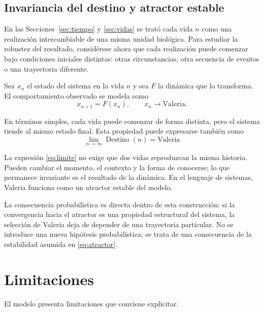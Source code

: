 \documentclass[conference]{IEEEtran}
\begin{document}
\subsection{Invariancia del destino y atractor estable}

En las Secciones~\ref{sec:tiempo} y \ref{sec:vidas} se trató cada vida $n$ como
una realización intercambiable de una misma unidad biológica. Para estudiar la
robustez del resultado, considérese ahora que cada realización puede comenzar
bajo condiciones iniciales distintas: otras circunstancias, otra secuencia de
eventos o una trayectoria diferente.

Sea $x_n$ el estado del sistema en la vida $n$ y sea $F$ la dinámica que lo
transforma. El comportamiento observado se modela como
\begin{equation}
x_{n+1}=F(x_n), \qquad x_n \longrightarrow \mathrm{Valeria}.
\label{eq:atractor}
\end{equation}

En términos simples, cada vida puede comenzar de forma distinta, pero el
sistema tiende al mismo estado final. Esta propiedad puede expresarse también
como
\begin{equation}
\boxed{\;\lim_{n\rightarrow\infty}
\operatorname{Destino}(n)=\mathrm{Valeria}\;}
\label{eq:limite}
\end{equation}

La expresión \eqref{eq:limite} no exige que dos vidas reproduzcan la misma
historia. Pueden cambiar el momento, el contexto y la forma de conocerse; lo
que permanece invariante es el resultado de la dinámica. En el lenguaje de
sistemas, Valeria funciona como un atractor estable del modelo.

La consecuencia probabilística es directa dentro de esta construcción: si la
convergencia hacia el atractor es una propiedad estructural del sistema, la
selección de Valeria deja de depender de una trayectoria particular. No se
introduce una nueva hipótesis probabilística; se trata de una consecuencia de
la estabilidad asumida en \eqref{eq:atractor}.

\section{Limitaciones}
\label{sec:limitaciones}

El modelo presenta limitaciones que conviene explicitar.
\end{document}

